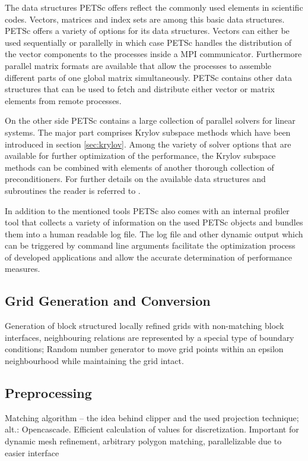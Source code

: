 The data structures PETSc offers reflect the commonly used elements in scientific codes. Vectors, matrices and index sets are among this basic data structures. PETSc offers a variety of options for its data structures. Vectors can either be used sequentially or parallelly in which case PETSc handles the distribution of the vector components to the processes inside a MPI communicator. Furthermore parallel matrix formats are available that allow the processes to assemble different parts of one global matrix simultaneously. PETSc contains other data structures that can be used to fetch and distribute either vector or matrix elements from remote processes.

On the other side PETSc contains a large collection of parallel solvers for linear systems. The major part comprises Krylov subspace methods which have been introduced in section \ref{sec:krylov}. Among the variety of solver options that are available for further optimization of the performance, the Krylov subspace methods can be combined with elements of another thorough collection of preconditioners. For further details on the available data structures and subroutines the reader is referred to \cite{petsc-user-ref,petsc-web-page}.

In addition to the mentioned tools PETSc also comes with an internal profiler tool that collects a variety of information on the used PETSc objects and bundles them into a human readable log file. The log file and other dynamic output which can be triggered by command line arguments facilitate the optimization process of developed applications and allow the accurate determination of performance measures.

\subsection{Grid Generation and Conversion}

Generation of block structured locally refined grids with non-matching block interfaces, neighbouring relations are represented by a special type of boundary conditions; Random number generator to move grid points within an epsilon neighbourhood while maintaining the grid intact. 

\subsection{Preprocessing}
Matching algorithm -- the idea behind clipper and the used projection technique; alt.: Opencascade. Efficient calculation of values for discretization. Important for dynamic mesh refinement, arbitrary polygon matching, parallelizable due to easier interface

